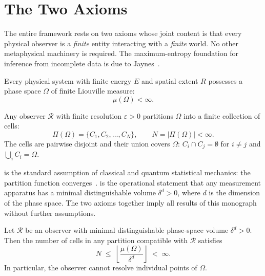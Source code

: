 \section{The Two Axioms}
\label{sec:axioms}

The entire framework rests on two axioms whose joint content is that every
physical observer is a \emph{finite} entity interacting with a \emph{finite}
world.  No other metaphysical machinery is required.  The maximum-entropy
foundation for inference from incomplete data is due to Jaynes~\citep{Jaynes1957}.

\begin{axiom}
\label{ax:bounded-phase}
Every physical system with finite energy $E$ and spatial extent $R$ possesses a
phase space $\Omega$ of finite Liouville measure:
\[
  \mu(\Omega) < \infty .
\]
\end{axiom}

\begin{axiom}
\label{ax:categorical-obs}
Any observer $\mathcal{R}$ with finite resolution $\varepsilon > 0$ partitions
$\Omega$ into a finite collection of cells:
\[
  \Pi(\Omega) = \bigl\{ C_1, C_2, \ldots, C_N \bigr\}, \qquad
  N = |\Pi(\Omega)| < \infty .
\]
The cells are pairwise disjoint and their union covers $\Omega$:
$C_i \cap C_j = \emptyset$ for $i \neq j$ and $\bigcup_i C_i = \Omega$.
\end{axiom}

\begin{remark}
 is the standard assumption of classical and quantum
statistical mechanics: the partition function converges~\citep{Callen1985}.
 is the operational statement that any measurement
apparatus has a minimal distinguishable volume $\delta^d > 0$, where $d$ is
the dimension of the phase space.  The two axioms together imply all results
of this monograph without further assumptions.
\end{remark}

\begin{theorem}
\label{thm:forced-partitioning}
Let $\mathcal{R}$ be an observer with minimal distinguishable phase-space volume
$\delta^d > 0$.  Then the number of cells in any partition compatible with
$\mathcal{R}$ satisfies
\[
  N \;\leq\; \left\lfloor \frac{\mu(\Omega)}{\delta^d} \right\rfloor
  \;<\; \infty .
\]
In particular, the observer cannot resolve individual points of $\Omega$.
\end{theorem}

